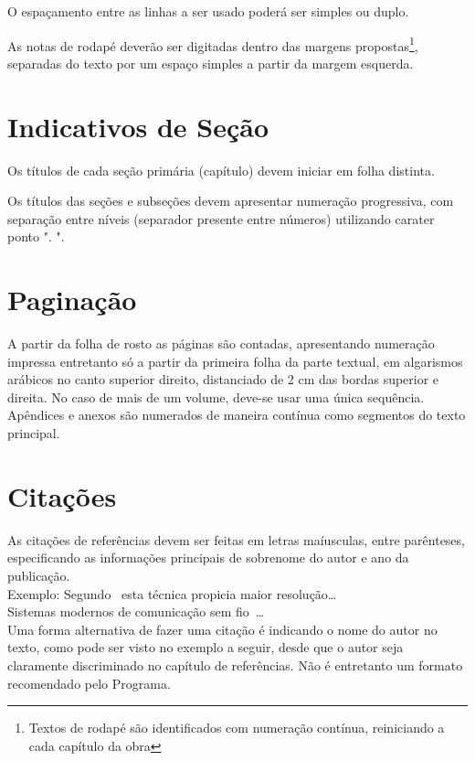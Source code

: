 \documentclass[repeatfields,xlists,xpacks,oneside]{ufrgscca}
\begin{document}
O espaçamento entre as linhas a ser usado poderá ser simples ou duplo.

As notas de rodapé deverão ser digitadas dentro das margens
propostas\footnote{Textos de rodapé são identificados com numeração
contínua, reiniciando a cada capítulo da obra}, separadas do texto por um
espaço simples a partir da margem esquerda.

\section{Indicativos de Seção}

Os títulos de cada seção primária (capítulo) devem iniciar em folha
distinta.

Os títulos das seções e subseções devem apresentar numeração progressiva,
com separação entre níveis (separador presente entre números) utilizando
carater ponto ". ".

\section{Paginação}

A partir da folha de rosto as páginas são contadas, apresentando numeração
impressa entretanto só a partir da primeira folha da parte textual, em
algarismos arábicos no canto superior direito, distanciado de 2 cm das
bordas superior e direita. No caso de mais de um volume, deve-se usar uma
única sequência. Apêndices e anexos são numerados de maneira contínua como
segmentos do texto principal.

\section{Citações}

As citações de referências devem ser feitas em letras maíusculas, entre
parênteses, especificando as informações principais de sobrenome do autor e
ano da publicação.\\

Exemplo: Segundo~\cite{Brito:IEE-1994} esta técnica propicia maior
resolução\ldots\\

Sistemas modernos de comunicação sem fio~\cite{Bilstrup:FCS-239}\ldots\\

Uma forma alternativa de fazer uma citação é indicando o nome do autor no
texto, como pode ser visto no exemplo a seguir, desde que o autor seja
claramente discriminado no capítulo de referências. Não é entretanto um
formato recomendado pelo Programa.\\
\end{document}
